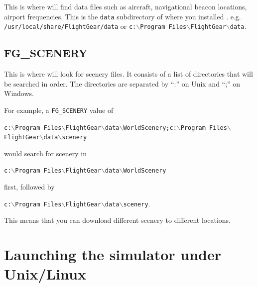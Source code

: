 This is where \FlightGear{} will find data files such as aircraft, navigational 
beacon locations, airport frequencies. This is the \texttt{data} subdirectory
of where you installed \FlightGear{}. e.g. 
\texttt{/usr/local/share/FlightGear/data} or 
\texttt{c:$\backslash$Program Files$\backslash$FlightGear$\backslash$data}.

\subsection{FG\_SCENERY}

This is where \FlightGear{} will look for scenery files. It consists of a list 
of directories that will be searched in order. The directories are separated
by ``:'' on Unix and ``;'' on Windows.
 
For example, a \texttt{FG\_SCENERY} value of

\noindent
\texttt{c:$\backslash$Program Files$\backslash$FlightGear$\backslash$data$\backslash$WorldScenery;c:$\backslash$Program Files$\backslash$FlightGear$\backslash$data$\backslash$scenery}

\noindent
would search for scenery in 

\noindent
\texttt{c:$\backslash$Program Files$\backslash$FlightGear$\backslash$data$\backslash$WorldScenery}

\noindent
first, followed by

\noindent
\texttt{c:$\backslash$Program Files$\backslash$FlightGear$\backslash$data$\backslash$scenery}.

This means that you can download different scenery to different locations.

\section{Launching the simulator under Unix/Linux}

\centerline{}
\smallskip

